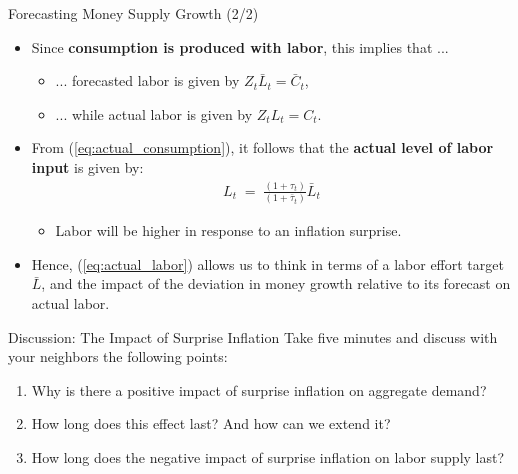 \documentclass[10pt,c,aspectratio=1610,handout]{beamer}
\begin{document}
\begin{frame}{Forecasting Money Supply Growth (2/2)}%
  \begin{itemize}%
    \item[$\blacktriangleright$] Since \textbf{consumption is produced with labor}, this implies that ...%
    \begin{itemize}
      \item[$\rightarrow$] ... forecasted labor is given by $Z_t \bar{L}_t = \bar{C}_t$,%
      \item[$\rightarrow$] ... while actual labor is given by $Z_t L_t = C_t$.%
    \end{itemize}
    \vspace*{0.2in}%
    \pause%
    \item[$\blacktriangleright$] From (\ref{eq:actual_consumption}), it follows that the \textbf{actual level of labor input} is given by:%
    \begin{align}%
      L_{t} \; = \; \frac{(1+\tau_{t})}{(1+\bar{\tau}_{t})} \bar{L}_{t}\label{eq:actual_labor}%
    \end{align}%
    \vspace*{-0.2in}%
    \begin{itemize}%
      \item[$\rightarrow$] Labor will be higher in response to an inflation surprise.%
    \end{itemize}%
    \vspace*{0.2in}%
    \pause%
    \item[$\blacktriangleright$] Hence, (\ref{eq:actual_labor}) allows us to think in terms of a labor effort target $\bar{L}$, and the impact of the deviation in money growth relative to its forecast on actual labor.%
  \end{itemize}%
\end{frame}%
\begin{frame}{Discussion: The Impact of Surprise Inflation}%
  Take five minutes and discuss with your neighbors the following points:%
  \begin{enumerate}%
    \item Why is there a positive impact of surprise inflation on aggregate demand?%
    \item How long does this effect last? And how can we extend it?%
    \item How long does the negative impact of surprise inflation on labor supply last?%
  \end{enumerate}%
\end{frame}%
\end{document}

